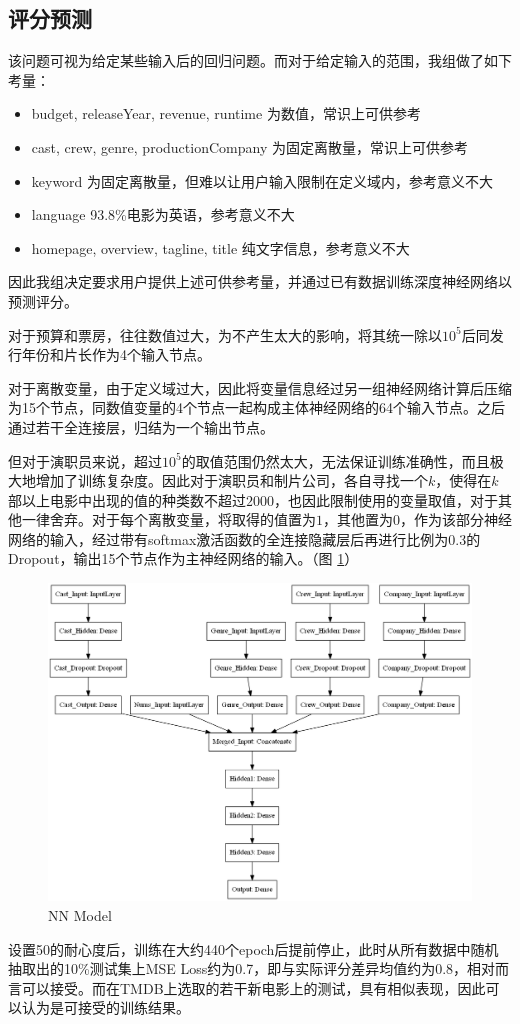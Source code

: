 \documentclass[UTF8]{ctexart}
\begin{document}
\subsection{评分预测}
\par 该问题可视为给定某些输入后的回归问题。而对于给定输入的范围，我组做了如下考量：
\begin{itemize}
  \item{budget, releaseYear, revenue, runtime} 为数值，常识上可供参考
  \item{cast, crew, genre, productionCompany} 为固定离散量，常识上可供参考
  \item{keyword} 为固定离散量，但难以让用户输入限制在定义域内，参考意义不大
  \item{language} 93.8\%电影为英语，参考意义不大
  \item{homepage, overview, tagline, title} 纯文字信息，参考意义不大
\end{itemize}
\par 因此我组决定要求用户提供上述可供参考量，并通过已有数据训练深度神经网络以预测评分。
\par 对于预算和票房，往往数值过大，为不产生太大的影响，将其统一除以$10^5$后同发行年份和片长作为4个输入节点。
\par 对于离散变量，由于定义域过大，因此将变量信息经过另一组神经网络计算后压缩为15个节点，同数值变量的4个节点一起构成主体神经网络的64个输入节点。之后通过若干全连接层，归结为一个输出节点。
\par 但对于演职员来说，超过$10^5$的取值范围仍然太大，无法保证训练准确性，而且极大地增加了训练复杂度。因此对于演职员和制片公司，各自寻找一个$k$，使得在$k$部以上电影中出现的值的种类数不超过$2000$，也因此限制使用的变量取值，对于其他一律舍弃。对于每个离散变量，将取得的值置为$1$，其他置为$0$，作为该部分神经网络的输入，经过带有softmax激活函数的全连接隐藏层后再进行比例为0.3的Dropout，输出15个节点作为主神经网络的输入。（图 \ref{fig:model}）
\begin{figure}[ht]
  \centering
  \includegraphics[scale=.4]{model.png}
  \caption{NN Model}
  \label{fig:model}
\end{figure}
\par 设置50的耐心度后，训练在大约440个epoch后提前停止，此时从所有数据中随机抽取出的10\%测试集上MSE Loss约为0.7，即与实际评分差异均值约为0.8，相对而言可以接受。而在TMDB上选取的若干新电影上的测试，具有相似表现，因此可以认为是可接受的训练结果。
\end{document}
